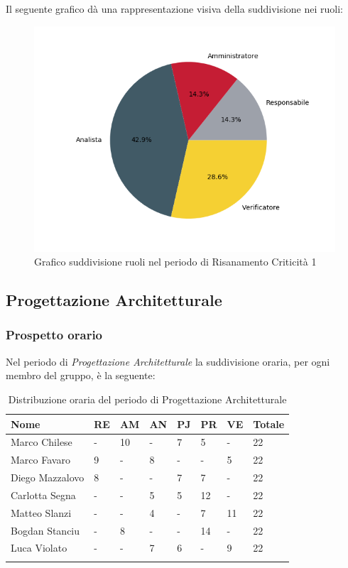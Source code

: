 Il seguente grafico dà una rappresentazione visiva della suddivisione nei ruoli:
\begin{figure}[H]
	\centering
  		\includegraphics[width=0.8\linewidth]{./images/torta_rc1.png}
  		\caption{Grafico suddivisione ruoli nel periodo di Risanamento Criticità 1}
  		\label{fig:grafico suddivione ruoli periodo di rc1}
\end{figure}


\subsection{Progettazione Architetturale}
\subsubsection{Prospetto orario}

Nel periodo di \textit{Progettazione Architetturale} la suddivisione oraria, per ogni membro del gruppo, è la seguente:


\begin{longtable}{|C{.30\textwidth}|C{.06\textwidth}|C{.06\textwidth}|C{.06\textwidth} | C{.06\textwidth}| C{.06\textwidth} | C{.06\textwidth} | C{.10\textwidth} |}
\hline
\textbf{Nome} & \textbf{RE} & \textbf{AM} & \textbf{AN} & \textbf{PJ} & \textbf{PR} & \textbf{VE} & \textbf{Totale}\\
\hline 
Marco Chilese & - & 10 & - & 7 & 5 & - & 22 \\
\hline
Marco Favaro & 9 & - & 8 & - & - & 5 & 22 \\
\hline
Diego Mazzalovo & 8 & - & - & 7 & 7 & - & 22 \\ 
\hline
Carlotta Segna & - & - & 5 & 5 & 12 & - & 22 \\
\hline
Matteo Slanzi & - & - & 4 & - & 7 & 11 & 22 \\
\hline
Bogdan Stanciu & - & 8 & - & - & 14 & - & 22 \\
\hline
Luca Violato & - & - & 7 & 6 & - & 9 & 22 \\
\hline 

\caption{Distribuzione oraria del periodo di Progettazione Architetturale}
\label{Distribuzione oraria del periodo di pa}
\end{longtable}

